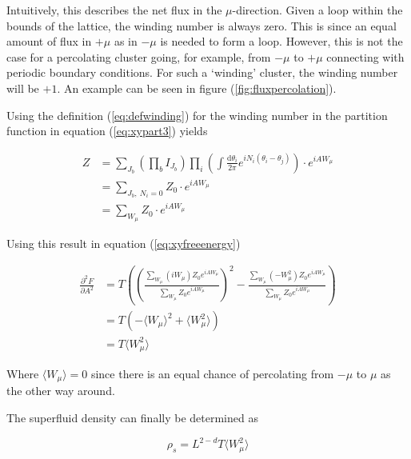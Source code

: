 Intuitively, this describes the net flux in the $\mu$-direction. Given a loop within the bounds of the lattice, the winding number is always zero. This is since an equal amount of flux in $+\mu$ as in $-\mu$ is needed to form a loop. However, this is not the case for a percolating cluster going, for example, from $-\mu$ to $+\mu$ connecting with periodic boundary conditions. For such a `winding' cluster, the winding number will be $+1$. An example can be seen in figure (\ref{fig:fluxpercolation}).


Using the definition (\ref{eq:defwinding}) for the winding number in the partition function in equation (\ref{eq:xypart3}) yields

\begin{align}
    Z &= \sum_{J_b} \left ( \prod_b I_{J_b} \right ) \prod_i \left ( \int \frac{\mathrm d \theta_i}{2 \pi} e^{i N_i (\theta_i - \theta_j)} \right ) \cdot e^{i A W_\mu} \\
    &= \sum_{J_b, \ N_i = 0} Z_0 \cdot e^{i A W_\mu} \\
    &= \sum_{W_\mu} Z_0 \cdot e^{i A W_\mu}
\end{align}

Using this result in equation (\ref{eq:xyfreeenergy})

\begin{align}
    \frac{\partial^2 F}{\partial A^2} &= T \left ( \left ( \frac{\sum_{W_\mu} (i W_\mu) Z_0 e^{iAW_\mu}}{\sum_{W_\mu} Z_0 e^{iAW_\mu}} \right )^2 - \frac{\sum_{W_\mu} (- W_\mu^2) Z_0 e^{iAW_\mu}}{\sum_{W_\mu} Z_0 e^{iAW_\mu}} \right ) \\
%
    &= T \left ( -\langle W_\mu \rangle^2 + \langle W_\mu^2 \rangle \right ) \\
%
    &= T \langle W_\mu^2 \rangle
\end{align}

Where $\langle W_\mu \rangle = 0$ since there is an equal chance of percolating from $-\mu$ to $\mu$ as the other way around.

The superfluid density can finally be determined as

\begin{equation}
    \rho_s = L^{2 - d} T \langle W_\mu^2 \rangle 
\end{equation}

